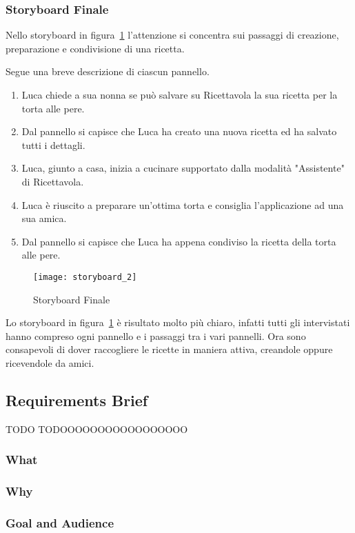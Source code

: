 \subsubsection{Storyboard Finale}

Nello storyboard in figura~\ref{fig:storyboard_2} l'attenzione si concentra sui passaggi di creazione, preparazione e condivisione di una ricetta.

Segue una breve descrizione di ciascun pannello.
\begin{enumerate}
  \item Luca chiede a sua nonna se può salvare su Ricettavola la sua ricetta per la torta alle pere.
  \item Dal pannello si capisce che Luca ha creato una nuova ricetta ed ha salvato tutti i dettagli.
  \item Luca, giunto a casa, inizia a cucinare supportato dalla modalità "Assistente" di Ricettavola.
  \item Luca è riuscito a preparare un'ottima torta e consiglia l'applicazione ad una sua amica.
  \item Dal pannello si capisce che Luca ha appena condiviso la ricetta della torta alle pere.
\end{enumerate}

\clearpage
\begin{figure}[!ht]
  \begin{center}
    \texttt{[image: storyboard\_2]}
    \caption{Storyboard Finale}
    \label{fig:storyboard_2}
  \end{center}
\end{figure}
\clearpage

Lo storyboard in figura~\ref{fig:storyboard_2} è risultato molto più chiaro, infatti tutti gli intervistati hanno compreso ogni pannello e i passaggi tra i vari pannelli.
Ora sono consapevoli di dover raccogliere le ricette in maniera attiva, creandole oppure ricevendole da amici.


\subsection{Requirements Brief}
TODO
TODOOOOOOOOOOOOOOOOO
\subsubsection{What}
\subsubsection{Why}
\subsubsection{Goal and Audience}

